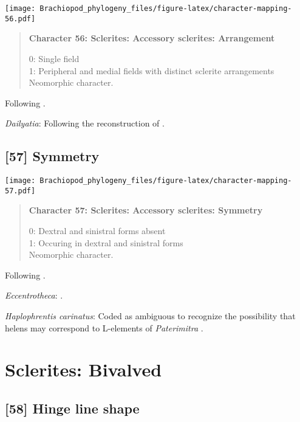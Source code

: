 \documentclass[openany]{book}
\theoremstyle{definition}
\theoremstyle{definition}
\theoremstyle{definition}
\theoremstyle{remark}
\begin{document}
\texttt{[image: Brachiopod\_phylogeny\_files/figure-latex/character-mapping-56.pdf]}

\begin{quote}
\textbf{Character 56: Sclerites: Accessory sclerites: Arrangement}

0: Single field\\
1: Peripheral and medial fields with distinct sclerite arrangements\\
Neomorphic character.
\end{quote}

Following \citet{Zhao2017}.

\hypertarget{Dailyatia-coding-56}{}
\emph{Dailyatia}: Following the reconstruction of
\citet{Skovsted2015Theearly}.

\subsection*{{[}57{]} Symmetry}\label{symmetry}

\texttt{[image: Brachiopod\_phylogeny\_files/figure-latex/character-mapping-57.pdf]}

\begin{quote}
\textbf{Character 57: Sclerites: Accessory sclerites: Symmetry}

0: Dextral and sinistral forms absent\\
1: Occuring in dextral and sinistral forms\\
Neomorphic character.
\end{quote}

Following \citet{Zhao2017}.

\hypertarget{Eccentrotheca-coding-57}{}
\emph{Eccentrotheca}: \citet{Skovsted2008Thescleritome}.

\hypertarget{Haplophrentis_carinatus-coding-57}{}
\emph{Haplophrentis carinatus}: Coded as ambiguous to recognize the
possibility that helens may correspond to L-elements of
\emph{Paterimitra} \citep{Moysiuk2017Hyolithsare}.

\section{Sclerites: Bivalved}\label{sclerites-bivalved}

\subsection*{{[}58{]} Hinge line shape}\label{hinge-line-shape}
\end{document}
